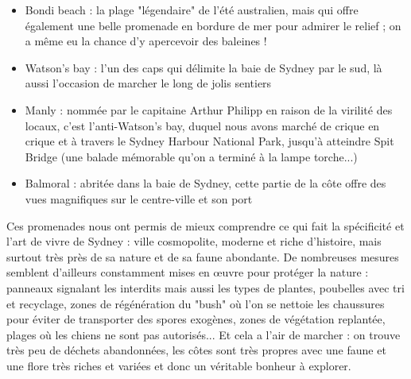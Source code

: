 \begin{itemize}
\tightlist
\item
  Bondi beach : la plage "légendaire" de l'été australien, mais qui
  offre également une belle promenade en bordure de mer pour admirer le
  relief ; on a même eu la chance d'y apercevoir des baleines !
\item
  Watson's bay : l'un des caps qui délimite la baie de Sydney par le
  sud, là aussi l'occasion de marcher le long de jolis sentiers
\item
  Manly : nommée par le capitaine Arthur Philipp en raison de la
  virilité des locaux, c'est l'anti-Watson's bay, duquel nous avons
  marché de crique en crique et à travers le Sydney Harbour National
  Park, jusqu'à atteindre Spit Bridge (une balade mémorable qu'on a
  terminé à la lampe torche...)
\item
  Balmoral : abritée dans la baie de Sydney, cette partie de la côte
  offre des vues magnifiques sur le centre-ville et son port
\end{itemize}

Ces promenades nous ont permis de mieux comprendre ce qui fait la
spécificité et l'art de vivre de Sydney : ville cosmopolite, moderne et
riche d'histoire, mais surtout très près de sa nature et de sa faune
abondante. De nombreuses mesures semblent d'ailleurs constamment mises
en œuvre pour protéger la nature : panneaux signalant les interdits mais
aussi les types de plantes, poubelles avec tri et recyclage, zones de
régénération du "bush" où l'on se nettoie les chaussures pour éviter de
transporter des spores exogènes, zones de végétation replantée, plages
où les chiens ne sont pas autorisés... Et cela a l'air de marcher : on
trouve très peu de déchets abandonnées, les côtes sont très propres avec
une faune et une flore très riches et variées et donc un véritable
bonheur à explorer.

